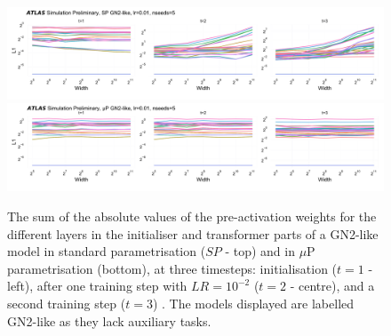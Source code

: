 \begin{figure}[h!]
  \centering
  \includegraphics[width=\textwidth]{Images/FTAG/GN/HPO/spweights.png}\\
  \includegraphics[width=\textwidth]{Images/FTAG/GN/HPO/mupweights.png}
  \caption{The sum of the absolute values of the pre-activation weights for the different layers in the initialiser and transformer parts of a GN2-like model in standard parametrisation ($SP$ - top) and in $\mu$P parametrisation (bottom), at three timesteps: initialisation ($t=1$ - left), after one training step with $LR = 10^{-2}$ ($t=2$ - centre), and a second training step ($t=3$) \cite{publicplotMUP}. The models displayed are labelled GN2-like as they lack auxiliary tasks.}
  \label{fig:muspweights}
\end{figure} 

